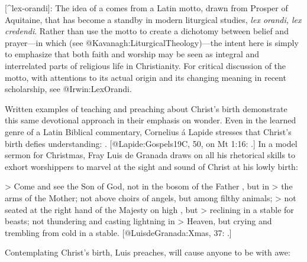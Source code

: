 [^lex-orandi]:
The idea of a  comes from a Latin motto, drawn from Prosper of
Aquitaine, that has become a standby in modern liturgical studies, \emph{lex orandi,
lex credendi}.
Rather than use the motto to create a dichotomy between belief and prayer---in
which  (see
@Kavanagh:LiturgicalTheology)---the intent here is simply to emphasize that both
faith and worship may be seen as integral and interrelated parts of religious
life in Christianity.
For critical discussion of the motto, with attentions to its actual origin and
its changing meaning in recent scholarship, see @Irwin:LexOrandi.

Written examples of teaching and preaching about Christ's birth demonstrate this
same devotional approach in their emphasis on wonder.
Even in the learned genre of a Latin Biblical commentary, Cornelius á Lapide
stresses that Christ's birth defies understanding: 
.
[@Lapide:Gospels19C, 50, on Mt 1:16:
.]
In a model sermon for Christmas, Fray Luis de Granada draws on all his
rhetorical skills to exhort worshippers to marvel at the sight and sound of
Christ at his lowly birth:

> Come and see the Son of God, not in the bosom of the Father , but in
> the arms of the Mother; not above choirs of angels, but among filthy animals;
> not seated at the right hand of the Majesty on high , but
> reclining in a stable for beasts; not thundering and casting lightning in
> Heaven, but crying and trembling from cold in a stable. \Dots{}
[@LuisdeGranada:Xmas, 37:
.]

\noindent
Contemplating Christ's birth, Luis preaches, will cause anyone to be  with awe:

